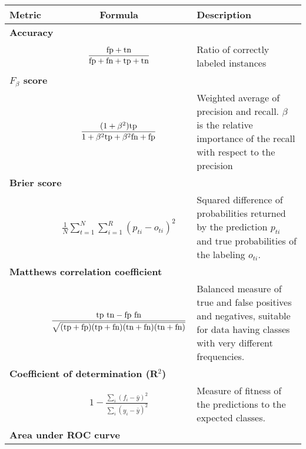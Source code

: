 	\begin{table}[!ht]
		\centering
		\begingroup
		\begin{tabularx}{\textwidth}{| l c X |}
			\hline
			Metric & Formula & Description \\
			\hline
			\multicolumn{3}{|l|}{\bf Accuracy}\\
			& $

				\begin{aligned}
					\frac {\fp + \tn} {\fp + \fn + \tp + \tn}
				\end{aligned}$
				& Ratio of correctly labeled instances\\
				\hline
			\multicolumn{3}{|l|}{\bf $F_\beta$ score}\\
			& $
				\begin{aligned}
					\frac {(1+\beta^2) \tp} {1+\beta^2 \tp+\beta^2 \fn+\fp}
				\end{aligned}
			$ & Weighted average of precision and recall. $\beta$ is the relative importance of the
			recall with respect to the precision\\
			\hline
			\multicolumn{3}{|l|}{\bf Brier score}\\
			& $
				\begin{aligned}
				\frac 1 N \sum_{t=1}^N \sum_{i=1}^R(p_{ti} - o_{ti})^2
				\end{aligned}
			$ & Squared difference of probabilities returned by the prediction $p_{ti}$ and true
			probabilities of the labeling $o_{ti}$.\\
			\hline
			\multicolumn{3}{|l|}{\bf Matthews correlation coefficient}\\
			& $
				\begin{aligned}
					\frac {\tp~\tn - \fp~\fn}
					{\sqrt{ (\tp + \fp)(\tp + \fn) (\tn + \fn) (\tn + \fn)}}
				\end{aligned}
			$ & Balanced measure of true and false positives and negatives, suitable for data
			having classes with very different frequencies.\\
			\hline
			\multicolumn{3}{|l|}{\bf Coefficient of determination (R$^2$)}\\
			& $
				\begin{aligned}
					1 -
					\frac{\sum_i (f_i - \bar{y})^2}
					{\sum_i (y_i-\bar{y})^2}
				\end{aligned}
			$ & Measure of fitness of the predictions to the expected classes.\\
			\hline
			\multicolumn{3}{|l|}{\bf Area under ROC curve}\\

\end{tabularx}
\end{table}
